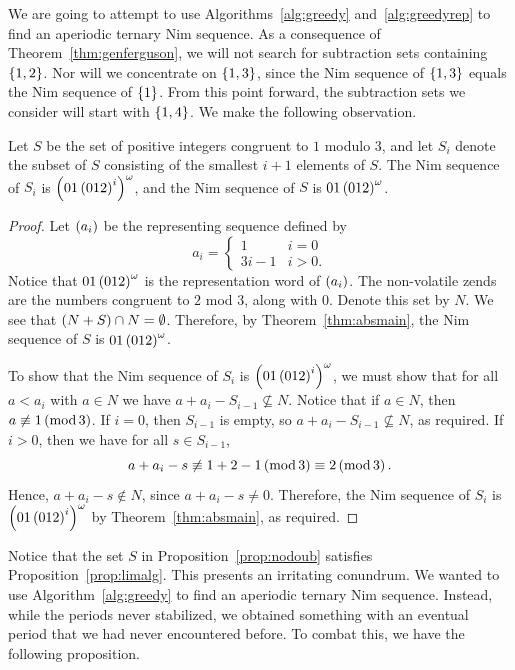 \documentclass[english,12pt]{article}
\newcommand{\seq}{\p}
\begin{document}
We are going to attempt to use Algorithms~\ref{alg:greedy} and~\ref{alg:greedyrep} to find an aperiodic ternary Nim sequence.  As a consequence of Theorem~\ref{thm:genferguson}, we will not search for subtraction sets containing $\left\{1,2\right\}$.  Nor will we concentrate on $\left\{1,3\right\}$, since the Nim sequence of $\left\{1,3\right\}$ equals the Nim sequence of $\left\{1\right\}$.  From this point forward, the subtraction sets we consider will start with $\left\{1,4\right\}$.
%
We make the following observation.
\begin{prop}\label{prop:nodoub}
Let $S$ be the set of positive integers congruent to $1$ modulo $3$, and let $S_i$ denote the subset of $S$ consisting of the smallest $i+1$ elements of $S$.  The Nim sequence of $S_i$ is $\left(01\left(012\right)^i\right)^\omega$, and the Nim sequence of $S$ is $01\left(012\right)^\omega$.
\end{prop}
\begin{proof}
Let $\seq{a_i}$ be the representing sequence defined by
\[
a_i=\begin{cases}
1 & i=0\\
3i-1 & i>0.
\end{cases}
\]
Notice that $01\left(012\right)^\omega$ is the representation word of $\seq{a_i}$.  The non-volatile zends are the numbers congruent to $2$ mod $3$, along with $0$.  Denote this set by $N$.  We see that $\left(N+S\right)\cap N=\emptyset$.  Therefore, by Theorem~\ref{thm:absmain}, the Nim sequence of $S$ is $01\left(012\right)^\omega$.

To show that the Nim sequence of $S_i$ is $\left(01\left(012\right)^i\right)^\omega$, we must show that for all $a<a_i$ with $a\in N$ we have $a+a_i-S_{i-1}\nsubseteq N$.  Notice that if $a\in N$, then $a\not\equiv1\left(\operatorname{mod}3\right)$.  If $i=0$, then $S_{i-1}$ is empty, so $a+a_i-S_{i-1}\nsubseteq N$, as required.  If $i>0$, then we have for all $s\in S_{i-1}$,
\[
a+a_i-s\not\equiv1+2-1\left(\operatorname{mod}3\right)\equiv2\left(\operatorname{mod}3\right).
\]
Hence, $a+a_i-s\notin N$, since $a+a_i-s\neq0$.  Therefore, the Nim sequence of $S_i$ is $\left(01\left(012\right)^i\right)^\omega$ by Theorem~\ref{thm:absmain}, as required.
\end{proof}
Notice that the set $S$ in Proposition~\ref{prop:nodoub} satisfies Proposition~\ref{prop:limalg}.  This presents an irritating conundrum.  We wanted to use Algorithm~\ref{alg:greedy} to find an aperiodic ternary Nim sequence.  Instead, while the periods never stabilized, we obtained something with an eventual period that we had never encountered before.  To combat this, we have the following proposition.
\end{document}
